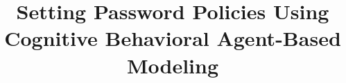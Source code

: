 \documentclass[conference]{IEEEtran}
\begin{document}
%
\title{Setting Password Policies Using Cognitive Behavioral Agent-Based Modeling\\[.75ex] 
}





% 
\end{document}
